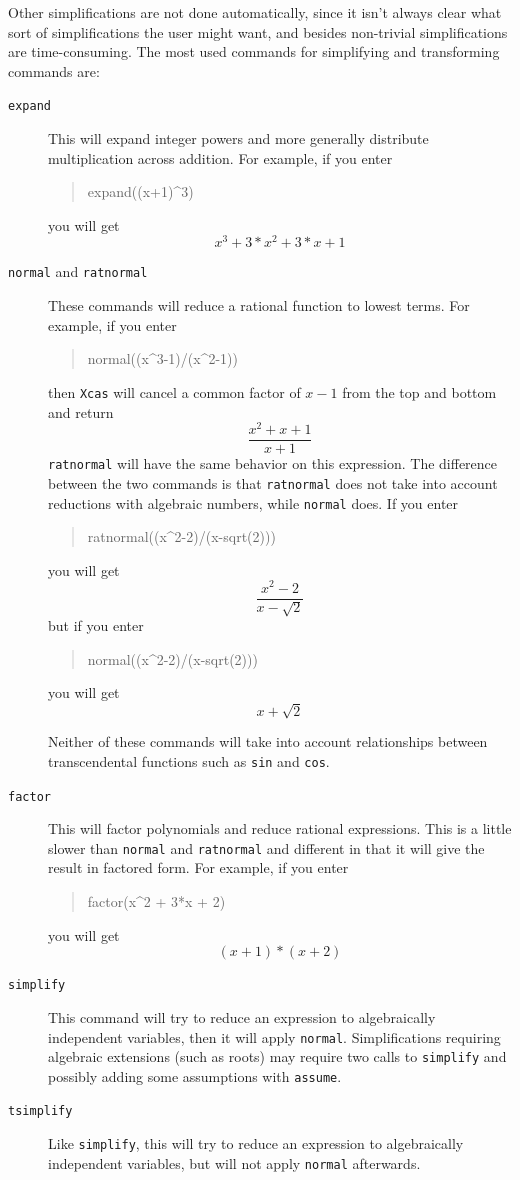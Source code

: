 \documentclass{article}
\newcommand{\xcasin}[1]
{\begin{quote}\ttfamily
#1
\end{quote}}
\newcommand{\xcasout}[1]
{\begin{equation*}
#1
\end{equation*}}
\begin{document}
Other simplifications are not done automatically, since it isn't
always clear what sort of simplifications the user might want, and
besides non-trivial simplifications are time-consuming.
The most used commands for simplifying and transforming commands are:
\begin{description}
  \item[\texttt{expand}]
  This will expand integer powers and more generally distribute
  multiplication across addition.  For example, if you enter
  \xcasin{expand((x+1)\^{}3)}
  you will get
  \xcasout{x^3 + 3*x^2 + 3*x + 1}
  
  \item[\texttt{normal} and \texttt{ratnormal}]
  These commands will reduce a rational function to lowest terms.  For
  example, if you enter
  \xcasin{normal((x\^{}3-1)/(x\^{}2-1))}
  then \texttt{Xcas} will cancel a common factor of $x-1$ from the top
  and bottom and return
  \xcasout{\frac{x^2+x+1}{x+1}}
  \texttt{ratnormal} will have the same behavior on this expression.
  The difference between the two commands is that \texttt{ratnormal}
  does not take into account reductions with algebraic numbers, while
  \texttt{normal} does.  If you enter
  \xcasin{ratnormal((x\^{}2-2)/(x-sqrt(2)))}
  you will get
  \xcasout{\frac{x^2-2}{x-\sqrt{2}}}
  but if you enter
  \xcasin{normal((x\^{}2-2)/(x-sqrt(2)))}
  you will get
  \xcasout{x+\sqrt{2}}
  
  Neither of these commands will take into account relationships
  between transcendental functions such as \texttt{sin} and \texttt{cos}.
    
  \item[\texttt{factor}]
  This will factor polynomials and reduce rational expressions.  This
  is a little slower than \texttt{normal} and \texttt{ratnormal} and
  different in that it will give the result in factored form.  For
  example, if you enter  
  \xcasin{factor(x\^{}2 + 3*x + 2)}
  you will get
  \xcasout{(x + 1)*(x + 2)}

  \item[\texttt{simplify}]
  This command will try to reduce an expression to algebraically
  independent variables, then it will apply \texttt{normal}.
  Simplifications requiring algebraic extensions (such as roots) may
  require two calls to \texttt{simplify} and possibly adding some
  assumptions with \texttt{assume}.  
  
  \item[\texttt{tsimplify}]
  Like \texttt{simplify}, this will try to reduce an expression to
  algebraically independent variables, but will not apply
  \texttt{normal} afterwards.
\end{description}  
\end{document}
